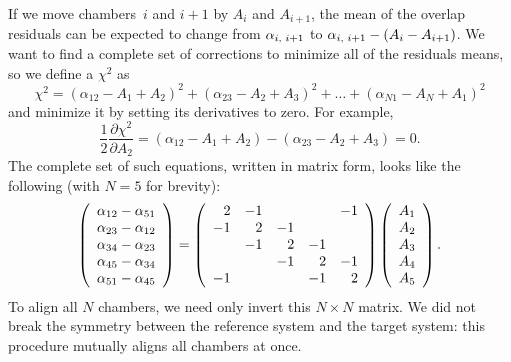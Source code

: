 \documentclass[12pt]{article}
\begin{document}
If we move chambers~$i$ and $i+1$ by $A_i$ and $A_{i+1}$, the mean of
the overlap residuals can be expected to change from
$\alpha_{i\mbox{\scriptsize, }i+1}$ to
$\alpha_{i\mbox{\scriptsize, }i+1} - (A_i - A_{i+1})$.  We want to find
a complete set of corrections to minimize all of the residuals means,
so we define a $\chi^2$ as
\begin{equation}
\chi^2 = (\alpha_{12} - A_1 + A_2)^2 + (\alpha_{23} - A_2 + A_3)^2 + \ldots + (\alpha_{N1} - A_N + A_1)^2
\end{equation}
and minimize it by setting its derivatives to zero.  For example,
\begin{equation}
\frac{1}{2} \frac{\partial \chi^2}{\partial A_2} = (\alpha_{12} - A_1 + A_2) - (\alpha_{23} - A_2 + A_3) = 0 \mbox{.}
\end{equation}
The complete set of such equations, written in matrix form, looks like
the following (with $N=5$ for brevity):
\begin{equation}
\left(\begin{array}{c}
\alpha_{12} - \alpha_{51} \\
\alpha_{23} - \alpha_{12} \\
\alpha_{34} - \alpha_{23} \\
\alpha_{45} - \alpha_{34} \\
\alpha_{51} - \alpha_{45}
\end{array} \right)
=
\left(\begin{array}{r r r r r}
2 & -1 &  &  & -1 \\
-1 & 2 & -1 &  &  \\
 & -1 & 2 & -1 &  \\
 &  & -1 & 2 & -1 \\
-1 &  &  & -1 & 2
\end{array}\right)
\left(\begin{array}{c}
A_1 \\
A_2 \\
A_3 \\
A_4 \\
A_5 \\
\end{array} \right)\mbox{.}
\label{eqn:NbyNmatrix}
\end{equation}
To align all $N$ chambers, we need only invert this $N\times N$
matrix.  We did not break the symmetry between the reference system
and the target system: this procedure mutually aligns all chambers at
once.
\end{document}

